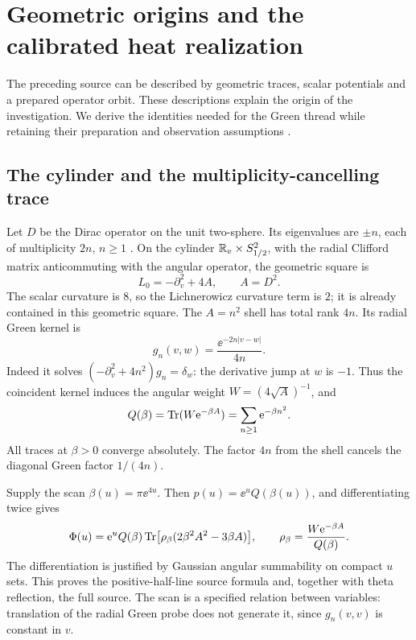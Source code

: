 \section{Geometric origins and the calibrated heat realization}
\label{sec:geometry}

The preceding source can be described by geometric traces, scalar
potentials and a prepared operator orbit. These descriptions explain the
origin of the investigation. We derive the identities needed for the
Green thread while retaining their preparation and observation assumptions
\cite{GNPBackground,OperatorProof,OperatorAssessment}.

\subsection{The cylinder and the multiplicity-cancelling trace}
Let \(D\) be the Dirac operator on the unit two-sphere. Its eigenvalues
are \(\pm n\), each of multiplicity \(2n\), \(n\ge1\)
\cite{CamporesiHiguchi1996}. On the cylinder
\(\mathbb R_v\times S^2_{1/2}\), with the radial Clifford matrix anticommuting
with the angular operator, the geometric square is
\begin{equation}\label{eq:cylinder-square}
 L_0=-\partial_v^2+4A,\qquad A=D^2.
\end{equation}
The scalar curvature is \(8\), so the Lichnerowicz curvature term is
\(2\); it is already contained in this geometric square. The
\(A=n^2\) shell has total rank \(4n\). Its radial Green kernel is
\[
 g_n(v,w)=\frac{\ee^{-2n|v-w|}}{4n}.
\]
Indeed it solves \((-\partial_v^2+4n^2)g_n=\delta_w\): the derivative
jump at \(w\) is \(-1\). Thus the coincident kernel induces the angular
weight \(W=(4\sqrt A)^{-1}\), and
\begin{equation}\label{eq:geometric-trace}
 Q(\beta)=\operatorname{Tr}(W\mathrm e^{-\beta A})=\sum_{n\ge1}\mathrm e^{-\beta n^2}.
\end{equation}
All traces at \(\beta>0\) converge absolutely. The factor \(4n\) from
the shell cancels the diagonal Green factor \(1/(4n)\).

Supply the scan \(\beta(u)=\pi\ee^{4u}\). Then
\(p(u)=\ee^u Q(\beta(u))\), and differentiating twice gives
\begin{equation}\label{eq:trace-source}
 \Phi(u)=\mathrm e^u Q(\beta)
 \operatorname{Tr}\bigl[\rho_\beta(2\beta^2A^2-3\beta A)\bigr],\qquad
 \rho_\beta=\frac{W\mathrm e^{-\beta A}}{Q(\beta)}.
\end{equation}
The differentiation is justified by Gaussian angular summability on
compact \(u\) sets. This proves the positive-half-line source formula
and, together with theta reflection, the full source. The scan is a
specified relation between variables: translation of the radial Green
probe does not generate it, since \(g_n(v,v)\) is constant in \(v\).

